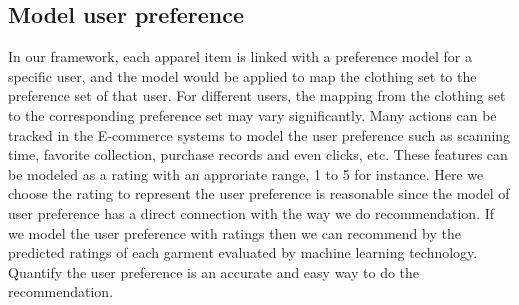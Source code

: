 \subsection{Model user preference}
In our framework, each apparel item is linked with a preference model for a specific user, and the model would be applied to map the clothing set to the preference set of that user. For different users, the mapping from the clothing set to the corresponding preference set may vary significantly. Many actions can be tracked in the E-commerce systems to model the user preference such as scanning time, favorite collection, purchase records and even clicks, etc. These features can be modeled
as a rating with an approriate range, 1 to 5 for instance. Here we choose the rating to represent the user preference is reasonable since the model of user preference has a direct connection with the way we do recommendation. If we model the user preference with ratings then we can recommend by the predicted ratings of each garment evaluated by machine learning technology. Quantify the user preference is an accurate and easy way to do the recommendation. 

